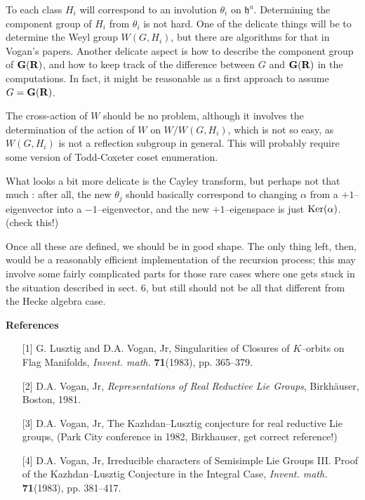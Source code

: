\documentclass[11 pt]{article}
\def\a{\alpha}
\def\G{{\bf G}}
\def\hf{{\mathfrak h}}
\def\Ker{{\rm Ker}}
\def\R{{\bf R}}
\def\t{\theta}
\begin{document}
To each class $H_i$ will correspond to an involution $\t_i$ on $\hf^a$.
Determining the component group of $H_i$ from $\t_i$ is not hard.
One of the delicate things will be to determine the Weyl group $W(G,H_i)$,
but there are algorithms for that in Vogan's papers. 
Another delicate aspect is how to describe the component
group of $\G(\R)$, and how to keep track of the difference between $G$ and
$\G(\R)$ in the computations. In fact, it might be reasonable as a first
approach to assume $G=\G(\R)$.

The cross-action of $W$ should be no problem, although it involves the
determination of the action of $W$ on $W/W(G,H_i)$, which is not so easy,
as $W(G,H_i)$ is not a reflection subgroup in general. This will probably
require some version of Todd-Coxeter coset enumeration.

What looks a bit more delicate
is the Cayley transform, but perhaps not that much : after all, the new $\t_j$
should basically correspond to changing $\a$ from a $+1$--eigenvector into
a $-1$--eigenvector, and the new $+1$--eigenspace is just $\Ker(\a)$. (check
this!)

Once all these are defined, we should be in good shape. The only thing left,
then, would be a reasonably efficient implementation of the recursion process;
this may involve some fairly complicated parts for those rare cases where
one gets stuck in the situation described in sect. 6, but still should not
be all that different from the Hecke algebra case.

\bigskip

\noindent\textbf{References}

\begin{itemize} pt
\item[{[1]}]G. Lusztig and D.A. Vogan, Jr, Singularities of Closures of 
$K$--orbits on Flag Manifolds, {\it Invent. math.} {\bf 71}(1983), pp. 
365--379.
\item[{[2]}]D.A. Vogan, Jr, {\it Representations of Real Reductive Lie Groups},
Birkh\"auser, Boston, 1981.
\item[{[3]}]D.A. Vogan, Jr, The Kazhdan--Lusztig conjecture for real reductive
Lie groups, (Park City conference in 1982, Birkhauser, get correct reference!)
\item[{[4]}]D.A. Vogan, Jr, Irreducible characters of Semisimple Lie Groups 
III. Proof of the Kazhdan--Lusztig Conjecture in the Integral Case, {\it
Invent. math.} {\bf 71}(1983), pp. 381--417.
\end{itemize}
\end{document}
